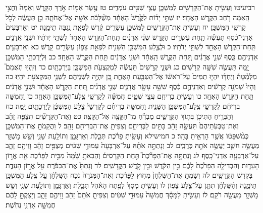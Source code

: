 \documentclass[twoside, openany, parskip=half, 11pt]{book}
\begin{document}
רביעיטו וְעָשִׂ֥יתָ אֶת־הַקְּרָשִׁ֖ים לַמִּשְׁכָּ֑ן עֲצֵ֥י שִׁטִּ֖ים עֹמְדִֽים׃ טז עֶ֥שֶׂר אַמּ֖וֹת אֹ֣רֶךְ הַקָּ֑רֶשׁ וְאַמָּה֙ וַחֲצִ֣י הָֽאַמָּ֔ה רֹ֖חַב הַקֶּ֥רֶשׁ הָאֶחָֽד׃ יז שְׁתֵּ֣י יָד֗וֹת לַקֶּ֙רֶשׁ֙ הָאֶחָ֔ד מְשֻׁ֨לָּבֹ֔ת אִשָּׁ֖ה אֶל־אֲחֹתָ֑הּ כֵּ֣ן תַּעֲשֶׂ֔ה לְכֹ֖ל קַרְשֵׁ֥י הַמִּשְׁכָּֽן׃ יח וְעָשִׂ֥יתָ אֶת־הַקְּרָשִׁ֖ים לַמִּשְׁכָּ֑ן עֶשְׂרִ֣ים קֶ֔רֶשׁ לִפְאַ֖ת נֶ֥גְבָּה תֵימָֽנָה׃ יט וְאַרְבָּעִים֙ אַדְנֵי־כֶ֔סֶף תַּעֲשֶׂ֕ה תַּ֖חַת עֶשְׂרִ֣ים הַקָּ֑רֶשׁ שְׁנֵ֨י אֲדָנִ֜ים תַּֽחַת־הַקֶּ֤רֶשׁ הָאֶחָד֙ לִשְׁתֵּ֣י יְדֹתָ֔יו וּשְׁנֵ֧י אֲדָנִ֛ים תַּֽחַת־הַקֶּ֥רֶשׁ הָאֶחָ֖ד לִשְׁתֵּ֥י יְדֹתָֽיו׃ כ וּלְצֶ֧לַע הַמִּשְׁכָּ֛ן הַשֵּׁנִ֖ית לִפְאַ֣ת צָפ֑וֹן עֶשְׂרִ֖ים קָֽרֶשׁ׃ כא וְאַרְבָּעִ֥ים אַדְנֵיהֶ֖ם כָּ֑סֶף שְׁנֵ֣י אֲדָנִ֗ים תַּ֚חַת הַקֶּ֣רֶשׁ הָֽאֶחָ֔ד וּשְׁנֵ֣י אֲדָנִ֔ים תַּ֖חַת הַקֶּ֥רֶשׁ הָאֶחָֽד׃ כב וּֽלְיַרְכְּתֵ֥י הַמִּשְׁכָּ֖ן יָ֑מָּה תַּעֲשֶׂ֖ה שִׁשָּׁ֥ה קְרָשִֽׁים׃ כג וּשְׁנֵ֤י קְרָשִׁים֙ תַּעֲשֶׂ֔ה לִמְקֻצְעֹ֖ת הַמִּשְׁכָּ֑ן בַּיַּרְכָתָֽיִם׃ כד וְיִֽהְי֣וּ תֹֽאֲמִם֮ מִלְּמַ֒טָּה֒ וְיַחְדָּ֗ו יִהְי֤וּ תַמִּים֙ עַל־רֹאשׁ֔וֹ אֶל־הַטַּבַּ֖עַת הָאֶחָ֑ת כֵּ֚ן יִהְיֶ֣ה לִשְׁנֵיהֶ֔ם לִשְׁנֵ֥י הַמִּקְצֹעֹ֖ת יִהְיֽוּ׃ כה וְהָיוּ֙ שְׁמֹנָ֣ה קְרָשִׁ֔ים וְאַדְנֵיהֶ֣ם כֶּ֔סֶף שִׁשָּׁ֥ה עָשָׂ֖ר אֲדָנִ֑ים שְׁנֵ֣י אֲדָנִ֗ים תַּ֚חַת הַקֶּ֣רֶשׁ הָאֶחָ֔ד וּשְׁנֵ֣י אֲדָנִ֔ים תַּ֖חַת הַקֶּ֥רֶשׁ הָאֶחָֽד׃ כו וְעָשִׂ֥יתָ בְרִיחִ֖ם עֲצֵ֣י שִׁטִּ֑ים חֲמִשָּׁ֕ה לְקַרְשֵׁ֥י צֶֽלַע־הַמִּשְׁכָּ֖ן הָאֶחָֽד׃ כז וַחֲמִשָּׁ֣ה בְרִיחִ֔ם לְקַרְשֵׁ֥י צֶֽלַע־הַמִּשְׁכָּ֖ן הַשֵּׁנִ֑ית וַחֲמִשָּׁ֣ה בְרִיחִ֗ם לְקַרְשֵׁי֙ צֶ֣לַע הַמִּשְׁכָּ֔ן לַיַּרְכָתַ֖יִם יָֽמָּה׃ כח וְהַבְּרִ֥יחַ הַתִּיכֹ֖ן בְּת֣וֹךְ הַקְּרָשִׁ֑ים מַבְרִ֕חַ מִן־הַקָּצֶ֖ה אֶל־הַקָּצֶֽה׃ כט וְֽאֶת־הַקְּרָשִׁ֞ים תְּצַפֶּ֣ה זָהָ֗ב וְאֶת־טַבְּעֹֽתֵיהֶם֙ תַּעֲשֶׂ֣ה זָהָ֔ב בָּתִּ֖ים לַבְּרִיחִ֑ם וְצִפִּיתָ֥ אֶת־הַבְּרִיחִ֖ם זָהָֽב׃ ל וַהֲקֵמֹתָ֖ אֶת־הַמִּשְׁכָּ֑ן כְּמִ֨שְׁפָּט֔וֹ אֲשֶׁ֥ר הׇרְאֵ֖יתָ בָּהָֽר׃
כ חמישילא וְעָשִׂ֣יתָ פָרֹ֗כֶת תְּכֵ֧לֶת וְאַרְגָּמָ֛ן וְתוֹלַ֥עַת שָׁנִ֖י וְשֵׁ֣שׁ מׇשְׁזָ֑ר מַעֲשֵׂ֥ה חֹשֵׁ֛ב יַעֲשֶׂ֥ה אֹתָ֖הּ כְּרֻבִֽים׃ לב וְנָתַתָּ֣ה אֹתָ֗הּ עַל־אַרְבָּעָה֙ עַמּוּדֵ֣י שִׁטִּ֔ים מְצֻפִּ֣ים זָהָ֔ב וָוֵיהֶ֖ם זָהָ֑ב עַל־אַרְבָּעָ֖ה אַדְנֵי־כָֽסֶף׃ לג וְנָתַתָּ֣ה אֶת־הַפָּרֹ֘כֶת֮ תַּ֣חַת הַקְּרָסִים֒ וְהֵבֵאתָ֥ שָׁ֙מָּה֙ מִבֵּ֣ית לַפָּרֹ֔כֶת אֵ֖ת אֲר֣וֹן הָעֵד֑וּת וְהִבְדִּילָ֤ה הַפָּרֹ֙כֶת֙ לָכֶ֔ם בֵּ֣ין הַקֹּ֔דֶשׁ וּבֵ֖ין קֹ֥דֶשׁ הַקֳּדָשִֽׁים׃ לד וְנָתַתָּ֙ אֶת־הַכַּפֹּ֔רֶת עַ֖ל אֲר֣וֹן הָעֵדֻ֑ת בְּקֹ֖דֶשׁ הַקֳּדָשִֽׁים׃ לה וְשַׂמְתָּ֤ אֶת־הַשֻּׁלְחָן֙ מִח֣וּץ לַפָּרֹ֔כֶת וְאֶת־הַמְּנֹרָה֙ נֹ֣כַח הַשֻּׁלְחָ֔ן עַ֛ל צֶ֥לַע הַמִּשְׁכָּ֖ן תֵּימָ֑נָה וְהַ֨שֻּׁלְחָ֔ן תִּתֵּ֖ן עַל־צֶ֥לַע צָפֽוֹן׃ לו וְעָשִׂ֤יתָ מָסָךְ֙ לְפֶ֣תַח הָאֹ֔הֶל תְּכֵ֧לֶת וְאַרְגָּמָ֛ן וְתוֹלַ֥עַת שָׁנִ֖י וְשֵׁ֣שׁ מׇשְׁזָ֑ר מַעֲשֵׂ֖ה רֹקֵֽם׃ לז וְעָשִׂ֣יתָ לַמָּסָ֗ךְ חֲמִשָּׁה֙ עַמּוּדֵ֣י שִׁטִּ֔ים וְצִפִּיתָ֤ אֹתָם֙ זָהָ֔ב וָוֵיהֶ֖ם זָהָ֑ב וְיָצַקְתָּ֣ לָהֶ֔ם חֲמִשָּׁ֖ה אַדְנֵ֥י נְחֹֽשֶׁת׃
\end{document}
